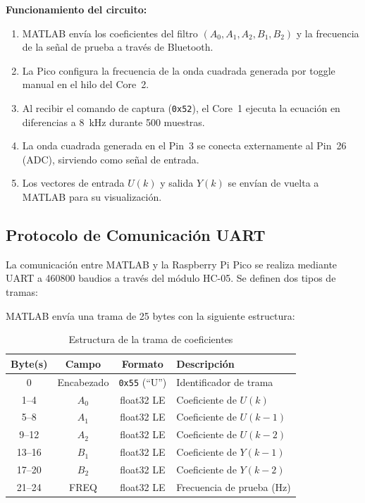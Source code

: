 \textbf{Funcionamiento del circuito:}
\begin{enumerate}
    \item MATLAB envía los coeficientes del filtro $(A_0, A_1, A_2, B_1, B_2)$ y la frecuencia de la señal de prueba a través de Bluetooth.
    \item La Pico configura la frecuencia de la onda cuadrada generada por toggle manual en el hilo del Core~2.
    \item Al recibir el comando de captura (\texttt{0x52}), el Core~1 ejecuta la ecuación en diferencias a 8~kHz durante 500 muestras.
    \item La onda cuadrada generada en el Pin~3 se conecta externamente al Pin~26 (ADC), sirviendo como señal de entrada.
    \item Los vectores de entrada $U(k)$ y salida $Y(k)$ se envían de vuelta a MATLAB para su visualización.
\end{enumerate}

\subsection{Protocolo de Comunicación UART}

La comunicación entre MATLAB y la Raspberry Pi Pico se realiza mediante UART a 460800 baudios a través del módulo HC-05. Se definen dos tipos de tramas:

MATLAB envía una trama de 25 bytes con la siguiente estructura:

\begin{table}[H]
    \centering
    \caption{Estructura de la trama de coeficientes}
    \begin{tabular}{|c|c|c|l|}
        \hline
        \rowcolor{subheadblue}\textbf{Byte(s)} & \textbf{Campo} & \textbf{Formato} & \textbf{Descripción} \\
        \hline
        0 & Encabezado & \texttt{0x55} (``U'') & Identificador de trama \\
        \hline
        1--4 & $A_0$ & float32 LE & Coeficiente de $U(k)$ \\
        \hline
        5--8 & $A_1$ & float32 LE & Coeficiente de $U(k{-}1)$ \\
        \hline
        9--12 & $A_2$ & float32 LE & Coeficiente de $U(k{-}2)$ \\
        \hline
        13--16 & $B_1$ & float32 LE & Coeficiente de $Y(k{-}1)$ \\
        \hline
        17--20 & $B_2$ & float32 LE & Coeficiente de $Y(k{-}2)$ \\
        \hline
        21--24 & FREQ & float32 LE & Frecuencia de prueba (Hz) \\
        \hline
    \end{tabular}
\end{table}


